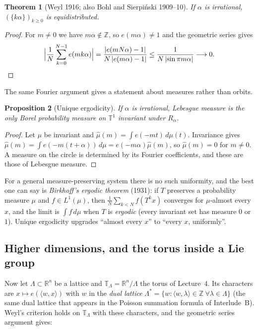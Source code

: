\documentclass[11pt,openany]{book}
\theoremstyle{plain}
\newtheorem{theorem}{Theorem}[chapter]
\newtheorem{proposition}[theorem]{Proposition}
\theoremstyle{definition}
\theoremstyle{remark}
\newcommand{\R}{\mathbb{R}}
\newcommand{\Z}{\mathbb{Z}}
\newcommand{\T}{\mathbb{T}}
\newcommand{\Lat}{\Lambda}             %
\newcommand{\abs}[1]{\left\lvert #1 \right\rvert}
\newcommand{\ip}[2]{\langle #1, #2\rangle}
\begin{document}
\begin{theorem}[Weyl 1916; also Bohl and Sierpi\'nski 1909--10]\label{ERG:thm:weyl}
If $\alpha$ is irrational, $(\{k\alpha\})_{k\ge0}$ is equidistributed.
\end{theorem}

\begin{proof}
For $m\neq0$ we have $m\alpha\notin\Z$, so $e(m\alpha)\neq1$ and the geometric series gives
\[
  \Big|\frac1N\sum_{k=0}^{N-1}e(mk\alpha)\Big|
  =\frac{\abs{e(mN\alpha)-1}}{N\abs{e(m\alpha)-1}}\le\frac{1}{N\abs{\sin\pi m\alpha}}\longrightarrow0 .
  \qedhere
\]
\end{proof}

The same Fourier argument gives a statement about measures rather than orbits.

\begin{proposition}[Unique ergodicity]\label{ERG:prop:ue}
If $\alpha$ is irrational, Lebesgue measure is the only Borel probability measure on $\T^1$ invariant
under $R_\alpha$.
\end{proposition}

\begin{proof}
Let $\mu$ be invariant and $\hat\mu(m)=\int e(-mt)\,d\mu(t)$. Invariance gives
$\hat\mu(m)=\int e(-m(t+\alpha))\,d\mu=e(-m\alpha)\hat\mu(m)$, so $\hat\mu(m)=0$ for $m\neq0$. A
measure on the circle is determined by its Fourier coefficients, and these are those of Lebesgue measure.
\end{proof}

For a general measure-preserving system there is no such uniformity, and the best one can say is
\emph{Birkhoff's ergodic theorem} (1931): if $T$ preserves a probability measure $\mu$ and
$f\in L^1(\mu)$, then $\frac1N\sum_{k<N}f(T^kx)$ converges for $\mu$-almost every $x$, and the limit is
$\int f\,d\mu$ when $T$ is \emph{ergodic} (every invariant set has measure $0$ or $1$). Unique
ergodicity upgrades ``almost every $x$'' to ``every $x$, uniformly''.

\subsection*{Higher dimensions, and the torus inside a Lie group}

Now let $\Lat\subset\R^n$ be a lattice and $\T_\Lat=\R^n/\Lat$ the torus of Lecture~4. Its
characters are $x\mapsto e(\ip{w}{x})$ with $w$ in the \emph{dual lattice}
$\Lat^*=\{w:\ip{w}{\lambda}\in\Z\ \forall\lambda\in\Lat\}$ (the same dual lattice that appears in the
Poisson summation formula of Interlude~B). Weyl's criterion holds on $\T_\Lat$ with these characters, and
the geometric series argument gives:
\end{document}
